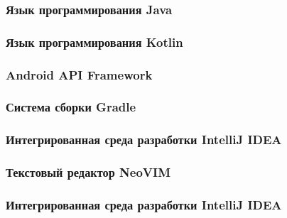 \subsubsection{Язык программирования Java}
\label{subsub:theory_and_motivation:tools:java}

\subsubsection{Язык программирования Kotlin}
\label{subsub:theory_and_motivation:tools:kotlin}

\subsubsection{Android API Framework}
\label{subsub:theory_and_motivation:tools:android_api_framework}

\subsubsection{Система сборки Gradle}
\label{subsub:theory_and_motivation:tools:gradle}

\subsubsection{Интегрированная среда разработки IntelliJ IDEA}
\label{subsub:theory_and_motivation:tools:intellij_idea}

\subsubsection{Текстовый редактор NeoVIM}
\label{subsub:theory_and_motivation:tools:neovim}

\subsubsection{Интегрированная среда разработки IntelliJ IDEA}
\label{subsub:theory_and_motivation:tools:intellij_idea}
